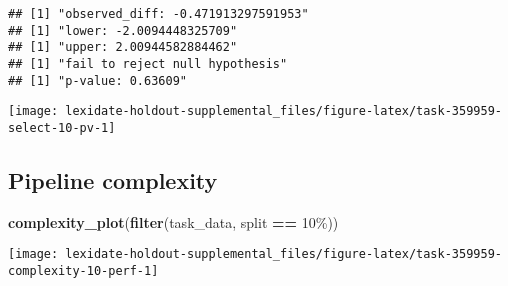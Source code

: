 \documentclass[
]{book}
\newenvironment{Shaded}{\begin{snugshade}}{\end{snugshade}}
\newcommand{\AttributeTok}[1]{\textcolor[rgb]{0.13,0.29,0.53}{#1}}
\newcommand{\DecValTok}[1]{\textcolor[rgb]{0.00,0.00,0.81}{#1}}
\newcommand{\FunctionTok}[1]{\textcolor[rgb]{0.13,0.29,0.53}{\textbf{#1}}}
\newcommand{\NormalTok}[1]{#1}
\newcommand{\OtherTok}[1]{\textcolor[rgb]{0.56,0.35,0.01}{#1}}
\newcommand{\SpecialCharTok}[1]{\textcolor[rgb]{0.81,0.36,0.00}{\textbf{#1}}}
\newcommand{\StringTok}[1]{\textcolor[rgb]{0.31,0.60,0.02}{#1}}
\begin{document}
\begin{Shaded}
\end{Shaded}

\begin{verbatim}
## [1] "observed_diff: -0.471913297591953"
## [1] "lower: -2.0094448325709"
## [1] "upper: 2.00944582884462"
## [1] "fail to reject null hypothesis"
## [1] "p-value: 0.63609"
\end{verbatim}

\texttt{[image: lexidate-holdout-supplemental\_files/figure-latex/task-359959-select-10-pv-1]}

\hypertarget{pipeline-complexity-34}{%
\subsection{Pipeline complexity}\label{pipeline-complexity-34}}

\begin{Shaded}
\begin{Highlighting}[]
\FunctionTok{complexity\_plot}\NormalTok{(}\FunctionTok{filter}\NormalTok{(task\_data, split }\SpecialCharTok{==} \StringTok{\textquotesingle{}10\%\textquotesingle{}}\NormalTok{))}
\end{Highlighting}
\end{Shaded}

\texttt{[image: lexidate-holdout-supplemental\_files/figure-latex/task-359959-complexity-10-perf-1]}
\end{document}
